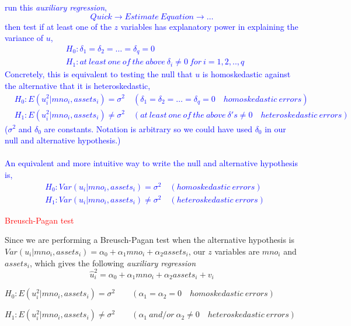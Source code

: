 \documentclass[12pt]{report}
\newenvironment{blueframed}[1][blue]
{\def\FrameCommand{\fboxsep=\FrameSep\fcolorbox{#1}{white}}%
\MakeFramed {\advance\hsize-\width \FrameRestore}}
{\endMakeFramed}
\begin{document}
\justify
\begin{blueframed}
	\vspace{-\baselineskip}
	\justify
	\noindent \textcolor{blue}
	{	\noindent run this \textit{auxiliary regression}, 
		$$Quick \to Estimate\ Equation \to \dots$$
		\noindent then test if at least one of the $z$ variables has explanatory power in explaining the variance of $u$,
		\begin{align*}
		&H_0: \delta_1 = \delta_2 = \dots = \delta_q = 0 \\
		&H_1:at\ least\ one\ of\ the\ above\ \delta_i \neq 0\ for\ i=1,2,..,q
		\end{align*}
		Concretely, this is equivalent to testing the null that $u$ is homoskedastic against the alternative that it is heteroskedastic,
		\begin{align*}
		&H_0: E(u^2_i|mno_i,assets_i) = \sigma^2 \quad (\delta_1 = \delta_2 = \dots = \delta_q = 0 \quad homoskedastic\ errors) \\
		&H_1: E(u^2_i|mno_i,assets_i) \neq \sigma^2 \quad (at\ least\ one\ of\ the\ above\ \delta's \neq 0 \quad heteroskedastic\ errors)
		\end{align*} ($\sigma^2$ and $\delta_0$ are constants. Notation is arbitrary so we could have used $\delta_0$ in our null and alternative hypothesis.) \\ \\ An equivalent and more intuitive way to write the null and alternative hypothesis is, \begin{align*}
		&H_0: Var(u_i|mno_i,assets_i) = \sigma^2 \quad (homoskedastic\ errors) \\
		&H_1: Var(u_i|mno_i,assets_i) \neq \sigma^2 \quad (heteroskedastic\ errors)
		\end{align*}
	}
\end{blueframed}

\noindent \textcolor{red}{Breusch-Pagan test}

\noindent Since we are performing a Breusch-Pagan test when the alternative hypothesis is $Var(u_i|mno_i , assets_i) = \alpha_0 + \alpha_1 mno_i + \alpha_2 assets_i$, our $z$ variables are $mno_i$ and $assets_i$, which gives the following \textit{auxiliary regression} $$\hat{u}^2_i = \alpha_0 + \alpha_1 mno_i + \alpha_2 assets_i + v_i$$

\noindent $H_0: E(u^2_i|mno_i,assets_i) = \sigma^2 \qquad (\alpha_1 = \alpha_2 = 0 \quad homoskedastic\ errors)$

\noindent $H_1: E(u^2_i|mno_i,assets_i) \neq \sigma^2 \qquad (\alpha_1\ and/or\ \alpha_2 \neq 0 \quad heteroskedastic\ errors)$
\end{document}
